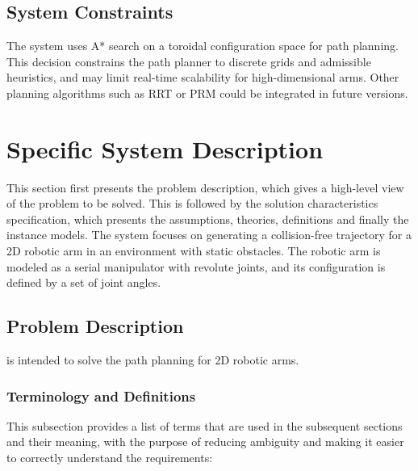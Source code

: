 \documentclass[12pt]{article}
\begin{document}
\subsection{System Constraints}
The system uses A* search on a toroidal configuration space for path planning. This decision constrains the path planner to discrete grids and admissible heuristics, and may limit real-time scalability for high-dimensional arms. Other planning algorithms such as RRT or PRM could be integrated in future versions.



\section{Specific System Description}

This section first presents the problem description, which gives a high-level
view of the problem to be solved.  This is followed by the solution characteristics
specification, which presents the assumptions, theories, definitions and finally
the instance models. The system focuses on generating a collision-free trajectory for a 2D robotic arm in an environment with static obstacles. The robotic arm is modeled as a serial manipulator with revolute joints, and its configuration is defined by a set of joint angles.


\subsection{Problem Description} \label{Sec_pd}

\progname{} is intended to solve the path planning for 2D robotic arms.



\subsubsection{Terminology and  Definitions}


This subsection provides a list of terms that are used in the subsequent
sections and their meaning, with the purpose of reducing ambiguity and making it
easier to correctly understand the requirements:
\end{document}
